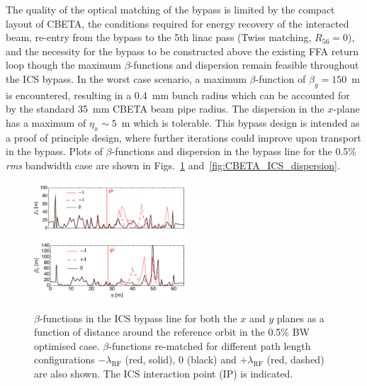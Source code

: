 \documentclass[../main.tex]{subfiles}
\begin{document}
The quality of the optical matching of the bypass is limited by the compact layout of CBETA, the conditions required for energy recovery of the interacted beam, re-entry from the bypass to the 5th linac pass (Twiss matching, $R_{56} =0$), and the necessity for the bypass to be constructed above the existing FFA return loop though the maximum $\beta$-functions and dispersion remain feasible throughout the ICS bypass. In the worst case scenario, a maximum $\beta$-function of $\beta_{y} = 150$~\si{\meter} is encountered, resulting in a 0.4~\si{\milli\meter} bunch radius which can be accounted for by the standard 35~\si{\milli\meter} CBETA beam pipe radius. The dispersion in the $x$-plane has a maximum of $\eta_{x}\sim5$~\si{\meter} which is tolerable. This bypass design is intended as a proof of principle design, where further iterations could improve upon transport in the bypass. Plots of $\beta$-functions and dispersion in the bypass line for the 0.5\% \textit{rms} bandwidth case are shown in Figs.~\ref{fig:CBETA_ICS_Twiss} and~\ref{fig:CBETA_ICS_dispersion}. 

\begin{figure}[!h]
\centering
\includegraphics[width=0.5\textwidth]{Figures/CBETA_Inverse_Compton_Source_Design/twissplotx.pdf}
\includegraphics[width=0.5\textwidth]{Figures/CBETA_Inverse_Compton_Source_Design/twissploty.pdf}
\caption{$\beta$-functions in the ICS bypass line for both the $x$ and $y$ planes as a function of distance around the reference orbit in the 0.5\% BW optimised case. $\beta$-functions re-matched for different path length configurations $-\lambda_{\mathrm{RF}}$ (red, solid), $0$ (black) and $+\lambda_{\mathrm{RF}}$ (red, dashed) are also shown. The ICS interaction point (IP) is indicated.}
\label{fig:CBETA_ICS_Twiss}
\end{figure}
\end{document}
